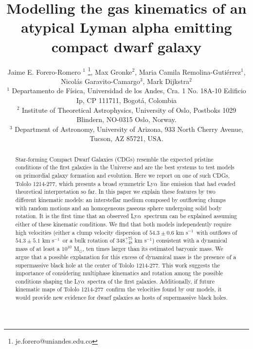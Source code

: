 \documentclass[a4,useAMS,usenatbib,usegraphicx]{mn2e}
\newcommand{\tol}{Tololo 1214-277}
\newcommand{\lya}{Ly$\alpha$}
\newcommand{\sigmaclump}{$54.3\pm 0.6$ km s$^{-1}$}
\newcommand{\inftyclump}{$54.3\pm 5.1$ km s$^{-1}$}
\begin{document}
\title[An atypical \lya\ dwarf galaxy]{
Modelling the gas kinematics of an atypical Lyman alpha emitting compact dwarf galaxy}
\author[J.E. Forero-Romero et al.]
{Jaime E. Forero-Romero $^{1}$ \thanks{je.forero@uniandes.edu.co},
Max Gronke$^2$, 
Maria Camila Remolina-Guti\'errez$^1$,
\newauthor
Nicol\'as Garavito-Camargo$^3$, 
Mark Dijkstra$^2$\\
$^1$ Departamento de F\'isica, Universidad de los Andes, Cra. 1
  No. 18A-10 Edificio Ip, CP 111711, Bogot\'a, Colombia \\
$^2$ Institute of Theoretical Astrophysics, University of Oslo,
Postboks 1029 Blindern, NO-0315 Oslo, Norway.\\
$^3$ Department of Astronomy, University of Arizona, 933 North Cherry
Avenue, Tucson, AZ 85721, USA. 
}


\maketitle


\begin{abstract}
  Star-forming Compact Dwarf Galaxies (CDGs) resemble the expected
  pristine conditions of the first galaxies in the Universe and
  are the best systems to test models on primordial
galaxy formation and evolution.    
Here we report on one of such CDGs, \tol, which presents
a broad symmetric \lya\ line emission that had evaded theoretical
interpretation so far. 
In this paper we explain these features by two different kinematic models: 
an interstellar medium composed by outflowing clumps with 
random motions and an homogeneous gaseous sphere undergoing solid body
rotation.
It is the first time that an observed \lya\ spectrum can be explained
assuming either of these kinematic conditions.
We find that both models independently require high velocities
(either a clump velocity dispersion of \sigmaclump\ with outflows of
\inftyclump\ or a bulk rotation of $348^{+75}_{-48}$ km s$^{-1}$)
consistent with a dynamical mass of at 
least a $10^{10}$ M$_{\odot}$, ten times larger than its estimated
baryonic mass.     
We argue that a possible explanation for this excess of
dynamical mass is the presence of a supermassive black hole at the
center of \tol. 
This work suggests the importance of considering multiphase
kinematics and rotation among the possible conditions shaping the
\lya\ spectra of the first galaxies.  
Additionally, if future kinematic maps of \tol\ confirm the 
velocities found by our models, it would provide new
evidence for dwarf galaxies as hosts of supermassive black
holes.  
\end{abstract}
\end{document}
